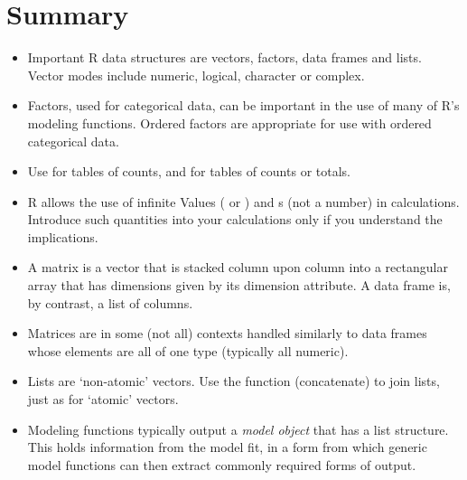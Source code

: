 \section{Summary}
\begin{itemize}
\item[] Important R data structures are vectors, factors, data frames and
  lists.  Vector modes include numeric, logical, character or complex.

\item[] Factors, used for categorical data, can be important in the use
  of many of R's modeling functions. Ordered factors are appropriate
for use with ordered categorical data.

\item[] Use  for tables of counts, and 
for tables of counts or totals.

\item[] R allows the use of infinite Values ( or
  ) and s (not a number) in calculations.
  Introduce such quantities into your calculations only if you
  understand the implications.

\item[] A matrix is a vector that is stacked column upon column into a
  rectangular array that has dimensions given by its dimension
  attribute.  A data frame is, by contrast, a list of columns.

\item[] 
Matrices are in some (not all) contexts handled similarly to data
  frames whose elements are all of one type (typically all numeric).

\item[] Lists are `non-atomic' vectors. Use the function
   (concatenate) to join lists, just as for `atomic'
  vectors.

\item[] Modeling functions
 typically output a
\textit{model object} that has a list structure.  This holds
information from the model fit, in a form from which generic model
functions can then extract commonly required forms of output.

\end{itemize}

